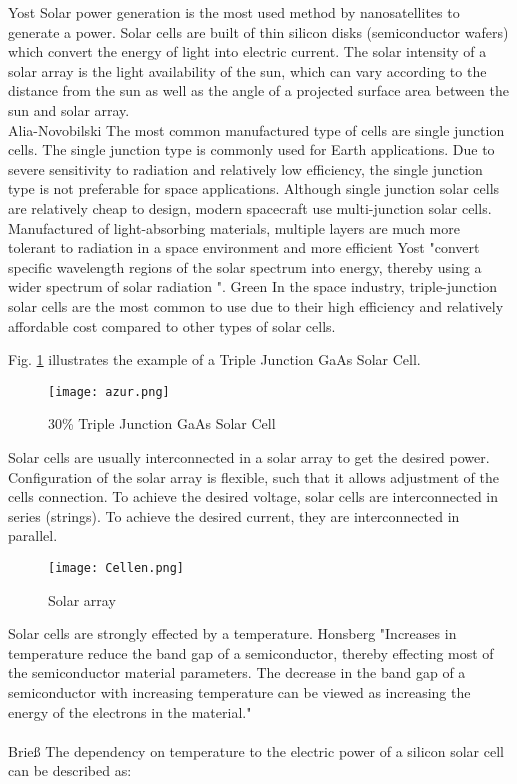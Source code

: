 Yost\cite{1} Solar power generation is the most used method by nanosatellites to generate a power. Solar cells are built of thin silicon disks (semiconductor wafers)  which convert the energy of light into electric current. The solar intensity of a solar array is the light availability of the sun, which can vary according to the distance from the sun as well as the angle of a projected surface area between the sun and solar array.  
\\
\noindent\hspace*{3mm} Alia-Novobilski\cite{2} The most common manufactured type of cells are single junction cells. The single junction type is commonly used for Earth applications. Due to severe sensitivity to radiation and relatively low efficiency, the single junction type is not preferable for space applications. Although single junction solar cells are relatively cheap to design, modern spacecraft use multi-junction solar cells. Manufactured of light-absorbing materials, multiple layers are much more tolerant to radiation in a space environment and more efficient  Yost\cite{1} "convert specific wavelength regions of the solar spectrum into energy, thereby using a wider spectrum of solar radiation ". 
Green\cite{3} In the space industry, triple-junction solar cells are the most common to use due to their high efficiency and relatively affordable cost compared to other types of solar cells.

Fig. \ref{fig: GaAs} illustrates the example of a Triple Junction GaAs Solar Cell.

\begin{figure}[h]
	\centering
	\texttt{[image: azur.png]}
	\caption{ 30\% Triple Junction GaAs Solar Cell \cite{4}}
	\label{fig: GaAs}
\end{figure}

Solar cells are usually interconnected in a solar array to get the desired power. Configuration of the solar array is flexible, such that it allows adjustment of the cells connection. To achieve the desired voltage, solar cells are interconnected in series (strings). To achieve the desired current, they are interconnected in parallel.\\

\newpage

\begin{figure}[h]
	\centering
	\texttt{[image: Cellen.png]}
	\caption{ Solar array}
	\label{array}
\end{figure}
	
Solar cells are strongly effected by a temperature. Honsberg\cite{5} "Increases in temperature reduce the band gap of a semiconductor, thereby effecting most of the semiconductor material parameters. The decrease in the band gap of a semiconductor with increasing temperature can be viewed as increasing the energy of the electrons in the material."\\
\\
Brieß\cite{6} The dependency on temperature to the electric power of a silicon solar cell can be described as:\\ \\ \\

